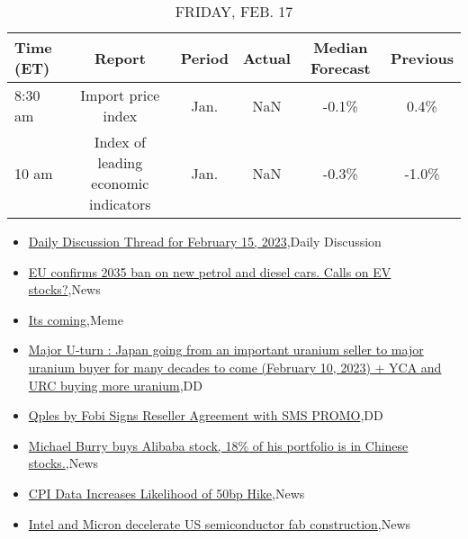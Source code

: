 \documentclass{article}%
\begin{document}
%


\begin{table}[htbp]%
\caption{FRIDAY, FEB. 17}%
\centering%
\begin{adjustbox}{width=1\textwidth}%
\begin{tabular}{lccccc}
\toprule
Time (ET) &                               Report & Period & Actual & Median Forecast & Previous \\
\midrule
  8:30 am &                   Import price index &   Jan. &    NaN &           -0.1\% &     0.4\% \\
    10 am & Index of leading economic indicators &   Jan. &    NaN &           -0.3\% &    -1.0\% \\
\bottomrule
\end{tabular}
%
\end{adjustbox}%
\end{table}

%
\begin{itemize}%
\item%
\href{https://reddit.com/r/wallstreetbets/comments/112vfwc/daily\_discussion\_thread\_for\_february\_15\_2023/}{Daily Discussion Thread for February 15, 2023},Daily Discussion%
\item%
\href{https://reddit.com/r/wallstreetbets/comments/112ugzc/eu\_confirms\_2035\_ban\_on\_new\_petrol\_and\_diesel/}{EU confirms 2035 ban on new petrol and diesel cars. Calls on EV stocks?},News%
\item%
\href{https://reddit.com/r/wallstreetbets/comments/112sp3b/its\_coming/}{Its coming},Meme%
\item%
\href{https://reddit.com/r/Baystreetbets/comments/112veii/major\_uturn\_japan\_going\_from\_an\_important\_uranium/}{Major U-turn : Japan going from an important uranium seller to major uranium buyer for many decades to come (February 10, 2023) + YCA and URC buying more uranium},DD%
\item%
\href{https://reddit.com/r/Baystreetbets/comments/112evoo/qples\_by\_fobi\_signs\_reseller\_agreement\_with\_sms/}{Qples by Fobi Signs Reseller Agreement with SMS PROMO},DD%
\item%
\href{https://reddit.com/r/StockMarket/comments/112qdmi/michael\_burry\_buys\_alibaba\_stock\_18\_of\_his/}{Michael Burry buys Alibaba stock, 18\% of his portfolio is in Chinese stocks.},News%
\item%
\href{https://reddit.com/r/Economics/comments/112r0rn/cpi\_data\_increases\_likelihood\_of\_50bp\_hike/}{CPI Data Increases Likelihood of 50bp Hike},News%
\item%
\href{https://reddit.com/r/Economics/comments/112p7oo/intel\_and\_micron\_decelerate\_us\_semiconductor\_fab/}{Intel and Micron decelerate US semiconductor fab construction},News%
\end{itemize}%
\end{document}

